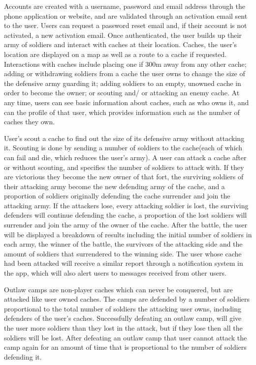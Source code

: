 Accounts are created with a username, password and email address through the phone application or website, and are validated through an activation email sent to the user. Users can request a password reset email and, if their account is not activated, a new activation email. Once authenticated, the user builds up their army of soldiers and interact with caches at their location. Caches, the user’s location are displayed on a map as well as a route to a cache if requested. Interactions with caches include placing one if 300m away from any other cache; adding or withdrawing soldiers from a cache the user owns to change the size of the defensive army guarding it; adding soldiers to an empty, unowned cache in order to become the owner; or scouting and/ or attacking an enemy cache. At any time, users can see basic information about caches, such as who owns it, and can the profile of that user, which provides information such as the number of caches they own.

User’s scout a cache to find out the size of its defensive army without attacking it. Scouting is done by sending a number of soldiers to the cache(each of which can fail and die, which reduces the user’s army). A user can attack a cache after or without scouting, and specifies the number of soldiers to attack with. If they are victorious they become the new owner of that fort, the surviving soldiers of their attacking army become the new defending army of the cache, and a proportion of soldiers originally defending the cache surrender and join the attacking army. If the attackers lose, every attacking soldier is lost, the surviving defenders will continue defending the cache, a proportion of the lost soldiers will surrender and join the army of the owner of the cache. After the battle, the user will be displayed a breakdown of results including the initial number of soldiers in each army, the winner of the battle, the survivors of the attacking side and the amount of soldiers that surrendered to the winning side. The user whose cache had been attacked will receive a similar report through a notification system in the app, which will also alert users to messages received from other users.

Outlaw camps are non-player caches which can never be conquered, but are attacked like user owned caches. The camps are defended by a number of soldiers proportional to the total number of soldiers the attacking user owns, including defenders of the user’s caches. Successfully defeating an outlaw camp, will give the user more soldiers than they lost in the attack, but if they lose then all the soldiers will be lost. After defeating an outlaw camp that user cannot attack the camp again for an amount of time that is proportional to the number of soldiers defending it.

